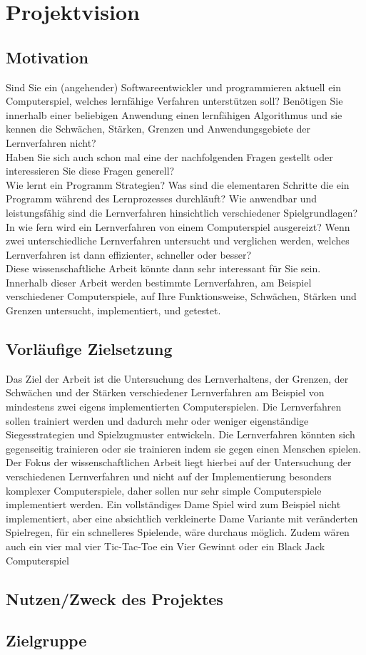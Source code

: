 \chapter{Projektvision}
\label{cha:projektvision}


\section{Motivation}
Sind Sie ein (angehender) Softwareentwickler und programmieren aktuell ein Computerspiel, welches lernfähige Verfahren unterstützen soll? Benötigen Sie innerhalb einer beliebigen Anwendung einen lernfähigen Algorithmus und sie kennen die Schwächen, Stärken, Grenzen und Anwendungsgebiete der Lernverfahren nicht?\\

Haben Sie sich auch schon mal eine der nachfolgenden Fragen gestellt oder interessieren Sie diese Fragen generell?\\

Wie lernt ein Programm Strategien? Was sind die elementaren Schritte die ein Programm  während des Lernprozesses durchläuft? Wie anwendbar und leistungsfähig sind die Lernverfahren hinsichtlich verschiedener Spielgrundlagen? In wie fern wird ein Lernverfahren von einem Computerspiel ausgereizt? Wenn zwei unterschiedliche Lernverfahren untersucht und verglichen werden, welches Lernverfahren ist dann effizienter, schneller oder besser?\\

Diese wissenschaftliche Arbeit könnte dann sehr interessant für Sie sein. Innerhalb dieser Arbeit werden bestimmte Lernverfahren, am Beispiel verschiedener Computerspiele, auf Ihre Funktionsweise, Schwächen, Stärken und Grenzen untersucht, implementiert, und getestet. 

\section{Vorläufige Zielsetzung}
Das Ziel der Arbeit ist die Untersuchung des Lernverhaltens, der Grenzen, der Schwächen und der Stärken verschiedener Lernverfahren am Beispiel von mindestens zwei eigens implementierten Computerspielen. Die Lernverfahren sollen trainiert werden und dadurch mehr oder weniger eigenständige Siegesstrategien und Spielzugmuster entwickeln. Die Lernverfahren könnten sich gegenseitig trainieren oder sie trainieren indem sie gegen einen Menschen spielen. Der Fokus der wissenschaftlichen Arbeit liegt hierbei auf der Untersuchung der verschiedenen Lernverfahren und nicht auf der Implementierung besonders komplexer Computerspiele, daher sollen nur sehr simple Computerspiele implementiert werden. Ein vollständiges Dame Spiel wird zum Beispiel nicht implementiert, aber eine absichtlich verkleinerte Dame Variante mit veränderten Spielregen, für ein schnelleres Spielende, wäre durchaus möglich. Zudem wären auch ein vier mal vier Tic-Tac-Toe ein Vier Gewinnt oder ein Black Jack Computerspiel

\section{Nutzen/Zweck des Projektes}

\section{Zielgruppe}